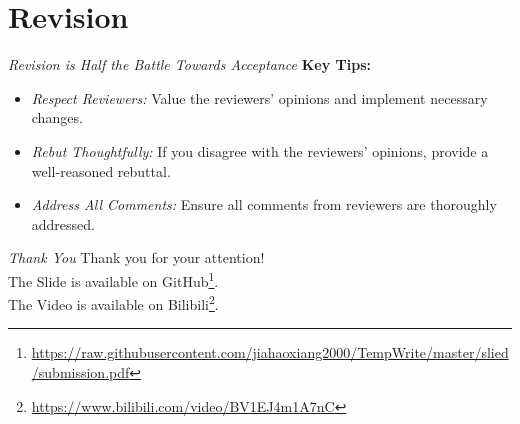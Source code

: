 \documentclass{beamer}
\begin{document}
\section{Revision}

\begin{frame}{\textit{Revision is Half the Battle Towards Acceptance}}
    \textbf{Key Tips:}
    \begin{itemize}
        \item \textit{Respect Reviewers:} Value the reviewers' opinions and implement necessary changes.
        \item \textit{Rebut Thoughtfully:} If you disagree with the reviewers' opinions, provide a well-reasoned rebuttal.
        \item \textit{Address All Comments:} Ensure all comments from reviewers are thoroughly addressed.
    \end{itemize}
\end{frame}


\begin{frame}{\textit{Thank You}}
    \centering
    \Large
    Thank you for your attention! \\
    \normalsize
    The Slide is available on GitHub{\footnotesize\footnote{\url{https://raw.githubusercontent.com/jiahaoxiang2000/TempWrite/master/slied/submission.pdf}}}.\\
    The Video is available on Bilibili{\footnotesize\footnote{\url{https://www.bilibili.com/video/BV1EJ4m1A7nC}}}.
\end{frame}
\end{document}
